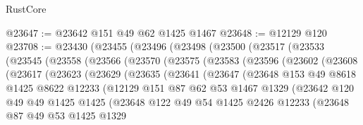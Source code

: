 \begin{lexlean}{RustCore}
\begin{coremodule}
@23647 := @23642 @151 @49 @62 @1425 @1467
@23648 := @12129 @120
@23708 := @23430
    (@23455
      (@23496
        (@23498
          (@23500
            (@23517
              (@23533
                (@23545
                  (@23558
                    (@23566
                      (@23570
                        (@23575
                          (@23583
                            (@23596
                              (@23602
                                (@23608
                                  (@23617
                                    (@23623
                                      (@23629
                                        (@23635
                                          (@23641
                                            (@23647
                                              (@23648
                                                @153
                                                @49
                                                @8618
                                                @1425
                                                @8622
                                                @12233
                                                (@12129
                                                  @151
                                                  @87
                                                  @62
                                                  @53
                                                  @1467
                                                  @1329
                                                  (@23642
                                                    @120
                                                    @49
                                                    @49
                                                    @1425
                                                    @1425
                                                    (@23648
                                                      @122
                                                      @49
                                                      @54
                                                      @1425
                                                      @2426
                                                      @12233
                                                      (@23648
                                                        @87
                                                        @49
                                                        @53
                                                        @1425
                                                        @1329

\end{coremodule}
\end{lexlean}
